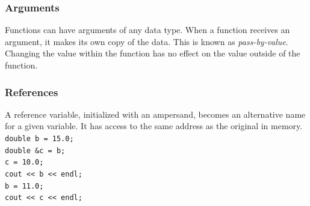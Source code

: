 \documentclass{if-beamer}
\begin{document}
\begin{frame}
\frametitle{Arguments}
Functions can have arguments of any data type. When a function receives
an argument, it makes its own copy of the data. This is known as
\textit{pass-by-value}. Changing the value within the function has no
effect on the value outside of the function.
\end{frame}

\begin{frame}
\frametitle{References}
A reference variable, initialized with an ampersand, becomes an
alternative name for a given variable. It has access to the same address
as the original in memory. \\
{\footnotesize \texttt{double b = 15.0;}} \\
{\footnotesize \texttt{double \&c = b;}} \\
{\footnotesize \texttt{c = 10.0;}} \\
{\footnotesize \texttt{cout << b << endl;}} \\
{\footnotesize \texttt{b = 11.0;}} \\
{\footnotesize \texttt{cout << c << endl;}}
\end{frame}
\end{document}
